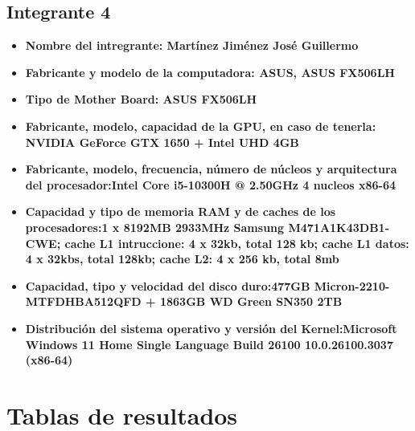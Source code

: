 \documentclass[12pt]{article}
\newcommand{\pl}[1]{\item \textbf{ #1 }}
\begin{document}
\subsection{Integrante 4}
\begin{itemize}
    \pl{Nombre del intregrante: Martínez Jiménez José Guillermo}

    \pl{Fabricante y modelo de la computadora: ASUS, ASUS FX506LH}

    \pl{Tipo de Mother Board: ASUS FX506LH}

    \pl{Fabricante, modelo, capacidad de la GPU, en caso de tenerla: NVIDIA GeForce GTX 1650 + Intel UHD 4GB}

    \pl{Fabricante, modelo, frecuencia, número de núcleos y arquitectura del procesador:Intel Core i5-10300H @ 2.50GHz 4 nucleos x86-64}

    \pl{Capacidad y tipo de memoria RAM y de caches de los procesadores:1 x 8192MB 2933MHz Samsung M471A1K43DB1-CWE; cache L1 intruccione: 4 x 32kb, total 128 kb; cache L1 datos: 4 x 32kbs, total 128kb; cache L2: 4 x 256 kb, total 8mb}

    \pl{Capacidad, tipo y velocidad del disco duro:477GB Micron-2210-MTFDHBA512QFD + 1863GB WD Green SN350 2TB}

    \pl{Distribución del sistema operativo y versión del Kernel:Microsoft Windows 11 Home Single Language Build 26100 10.0.26100.3037 (x86-64)}
\end{itemize}

\newpage
\section{Tablas de resultados}
\end{document}
